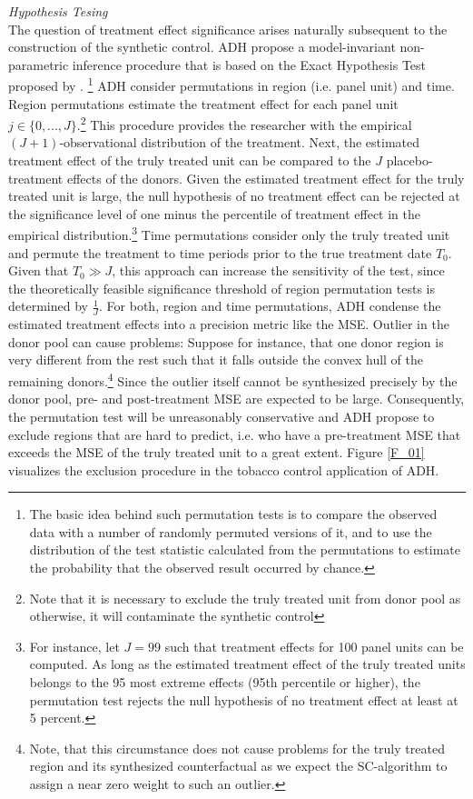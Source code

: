 \textit{Hypothesis Tesing}\\
The question of treatment effect significance arises naturally subsequent to the construction of the synthetic control. \ac{ADH} propose a model-invariant non-parametric inference procedure that is based on the Exact Hypothesis Test proposed by \cite{fisher:1971}. \footnote{The basic idea behind such permutation tests is to compare the observed data with a number of randomly permuted versions of it, and to use the distribution of the test statistic calculated from the permutations to estimate the probability that the observed result occurred by chance.} 
\ac{ADH} consider permutations in region (i.e. panel unit) and time. Region permutations estimate the treatment effect for each panel unit $j \in \{0, ..., J \}$.\footnote{Note that it is necessary to exclude the truly treated unit from donor pool as otherwise, it will contaminate the synthetic control} This procedure provides the researcher with the empirical $(J+1)$-observational distribution of the treatment. Next, the estimated treatment effect of the truly treated unit can be compared to the $J$ placebo-treatment effects of the donors. Given the estimated treatment effect for the truly treated unit is large, the null hypothesis of no treatment effect can be rejected at the significance level of one minus the percentile of treatment effect in the empirical distribution.\footnote{For instance, let $J = 99$ such that treatment effects for 100 panel units can be computed. As long as the estimated treatment effect of the truly treated units belongs to the 95 most extreme effects (95th percentile or higher), the permutation test rejects the null hypothesis of no treatment effect at least at 5 percent.} Time permutations consider only the truly treated unit and permute the treatment to time periods prior to the true treatment date $T_0$. Given that $T_0 \gg J$, this approach can increase the sensitivity of the test, since the theoretically feasible significance threshold of region permutation tests is determined by $\frac{1}{J}$. For both, region and time permutations, \ac{ADH} condense the estimated treatment effects into a precision metric like the \ac{MSE}. Outlier in the donor pool can cause problems: Suppose for instance, that one donor region is very different from the rest such that it falls outside the convex hull of the remaining donors.\footnote{Note, that this circumstance does not cause problems for the truly treated region and its synthesized counterfactual as we expect the \ac{SC}-algorithm to assign a near zero weight to such an outlier. } Since the outlier itself cannot be synthesized precisely by the donor pool, pre- and post-treatment \ac{MSE} are expected to be large. Consequently, the permutation test will be unreasonably conservative and \ac{ADH} propose to exclude regions that are hard to predict, i.e. who have a pre-treatment \ac{MSE} that exceeds the \ac{MSE} of the truly treated unit to a great extent. Figure \ref{F_01} visualizes the exclusion procedure in the tobacco control application of \ac{ADH}. 

